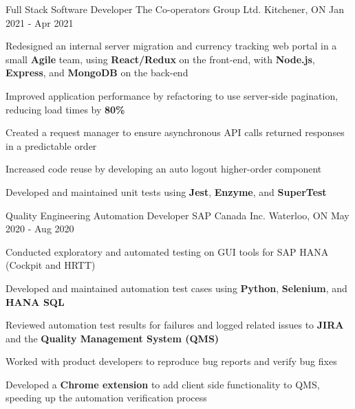 
\begin{cventries}
  \cventry
    {Full Stack Software Developer} %
    {The Co-operators Group Ltd.} %
    {Kitchener, ON} %
    {Jan 2021 - Apr 2021} %
    {
      \begin{cvitems} %
      \item {Redesigned an internal server migration and currency tracking web portal in a small \textbf{Agile} team, using \textbf{React/Redux} on the front-end, with \textbf{Node.js}, \textbf{Express}, and \textbf{MongoDB} on the back-end}
      \item {Improved application performance by refactoring to use server-side pagination, reducing load times by \textbf{80\%}}
      \item {Created a request manager to ensure asynchronous API calls returned responses in a predictable order}
      \item {Increased code reuse by developing an auto logout higher-order component}
      \item {Developed and maintained unit tests using \textbf{Jest}, \textbf{Enzyme}, and \textbf{SuperTest}}
      \end{cvitems}
    }
    
  \cventry
    {Quality Engineering Automation Developer} %
    {SAP Canada Inc.} %
    {Waterloo, ON} %
    {May 2020 - Aug 2020} %
    {
      \begin{cvitems} %
      \item {Conducted exploratory and automated testing on GUI tools for SAP HANA (Cockpit and HRTT)}
        \item {Developed and maintained automation test cases using \textbf{Python}, \textbf{Selenium}, and \textbf{HANA SQL}}
		\item {Reviewed automation test results for failures and logged related issues to \textbf{JIRA} and the \textbf{Quality Management System (QMS)}}
		\item {Worked with product developers to reproduce bug reports and verify bug fixes}
		\item {Developed a \textbf{Chrome extension} to add client side functionality to QMS, speeding up the automation verification process}
      \end{cvitems}
    }
       
\end{cventries}
